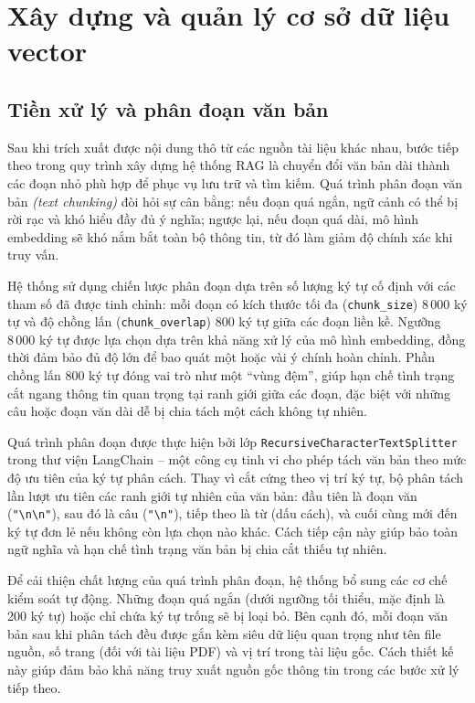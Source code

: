 \section{Xây dựng và quản lý cơ sở dữ liệu vector}

\subsection{Tiền xử lý và phân đoạn văn bản}

Sau khi trích xuất được nội dung thô từ các nguồn tài liệu khác nhau, bước tiếp theo trong quy trình xây dựng hệ thống RAG là chuyển đổi văn bản dài thành các đoạn nhỏ phù hợp để phục vụ lưu trữ và tìm kiếm. Quá trình phân đoạn văn bản \emph{(text chunking)} đòi hỏi sự cân bằng: nếu đoạn quá ngắn, ngữ cảnh có thể bị rời rạc và khó hiểu đầy đủ ý nghĩa; ngược lại, nếu đoạn quá dài, mô hình embedding sẽ khó nắm bắt toàn bộ thông tin, từ đó làm giảm độ chính xác khi truy vấn.

Hệ thống sử dụng chiến lược phân đoạn dựa trên số lượng ký tự cố định với các tham số đã được tinh chỉnh: mỗi đoạn có kích thước tối đa (\texttt{chunk\_size}) \(8\,000\) ký tự và độ chồng lấn (\texttt{chunk\_overlap}) 800 ký tự giữa các đoạn liền kề. Ngưỡng \(8\,000\) ký tự được lựa chọn dựa trên khả năng xử lý của mô hình embedding, đồng thời đảm bảo đủ độ lớn để bao quát một hoặc vài ý chính hoàn chỉnh. Phần chồng lấn 800 ký tự đóng vai trò như một ``vùng đệm'', giúp hạn chế tình trạng cắt ngang thông tin quan trọng tại ranh giới giữa các đoạn, đặc biệt với những câu hoặc đoạn văn dài dễ bị chia tách một cách không tự nhiên.

Quá trình phân đoạn được thực hiện bởi lớp \texttt{RecursiveCharacterTextSplitter} trong thư viện LangChain -- một công cụ tinh vi cho phép tách văn bản theo mức độ ưu tiên của ký tự phân cách. Thay vì cắt cứng theo vị trí ký tự, bộ phân tách lần lượt ưu tiên các ranh giới tự nhiên của văn bản: đầu tiên là đoạn văn (\texttt{"\textbackslash n\textbackslash n"}), sau đó là câu (\texttt{"\textbackslash n"}), tiếp theo là từ (dấu cách), và cuối cùng mới đến ký tự đơn lẻ nếu không còn lựa chọn nào khác. Cách tiếp cận này giúp bảo toàn ngữ nghĩa và hạn chế tình trạng văn bản bị chia cắt thiếu tự nhiên.

Để cải thiện chất lượng của quá trình phân đoạn, hệ thống bổ sung các cơ chế kiểm soát tự động. Những đoạn quá ngắn (dưới ngưỡng tối thiểu, mặc định là 200 ký tự) hoặc chỉ chứa ký tự trống sẽ bị loại bỏ. Bên cạnh đó, mỗi đoạn văn bản sau khi phân tách đều được gắn kèm siêu dữ liệu quan trọng như tên file nguồn, số trang (đối với tài liệu PDF) và vị trí trong tài liệu gốc. Cách thiết kế này giúp đảm bảo khả năng truy xuất nguồn gốc thông tin trong các bước xử lý tiếp theo.

